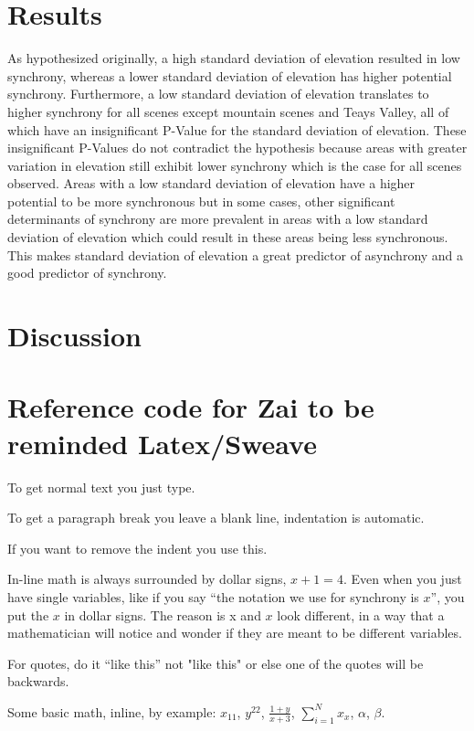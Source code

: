 \documentclass[letterpaper,11pt]{article}
\begin{document}
\section{Results}\label{section:results}
As hypothesized originally, a high standard deviation of elevation resulted in low synchrony, whereas a lower standard deviation of elevation has higher potential synchrony. Furthermore, a low standard deviation of elevation translates to higher synchrony for all scenes except mountain scenes and Teays Valley, all of which have an insignificant P-Value for the standard deviation of elevation. These insignificant P-Values do not contradict the hypothesis because areas with greater variation in elevation still exhibit lower synchrony which is the case for all scenes observed. Areas with a low standard deviation of elevation have a higher potential to be more synchronous but in some cases, other significant determinants of synchrony are more prevalent in areas with a low standard deviation of elevation which could result in these areas being less synchronous. This makes standard deviation of elevation a great predictor of asynchrony and a good predictor of synchrony.

\section{Discussion}\label{section:discussion}


\section{Reference code for Zai to be reminded Latex/Sweave}

To get normal text you just type.

To get a paragraph break you leave a blank line, indentation is automatic.

\noindent If you want to remove the indent you use this.

In-line math is always surrounded by dollar signs, $x+1=4$. Even when you just have single variables, like if you say ``the notation we use for synchrony is $x$'', you put the $x$ in dollar signs. The reason is x and $x$ look different, in a way that a mathematician will notice and wonder if they are meant to be different variables.

For quotes, do it ``like this'' not "like this" or else one of the quotes will be backwards.

Some basic math, inline, by example: $x_{11}$, $y^{22}$, $\frac{1+y}{x+3}$, $\sum_{i=1}^N x_x$,
$\alpha$, $\beta$.
\end{document}
